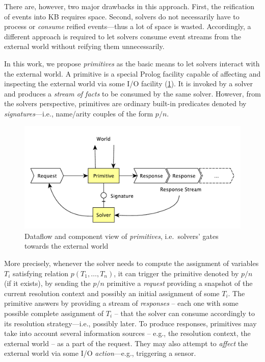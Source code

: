 \documentclass[12pt,a4paper,openright,twoside]{book}
\begin{document}
There are, however, two major drawbacks in this approach.
%
First, the reification of events into KB requires space.
%
Second, solvers do not necessarily have to process or \emph{consume} reified events---thus a lot of space is wasted.
%
Accordingly, a different approach is required to let solvers consume event streams from the external world without reifying them unnecessarily.

In this work, we propose \emph{primitives} as the basic means to let solvers interact with the external world.
%
A primitive is a special Prolog facility capable of affecting and inspecting the external world via some I/O facility (\cref{fig:primitives}).
%
It is invoked by a solver and produces a \emph{stream of facts} to be consumed by the same solver.
%
However, from the solvers perspective, primitives are ordinary built-in predicates denoted by \emph{signatures}---i.e., name/arity couples of the form $p/n$.

\begin{figure}\centering
    \includegraphics[width=\linewidth]{figures/primitive.pdf}
    \caption{Dataflow and component view of \emph{primitives}, i.e.\ solvers' gates towards the external world}
    \label{fig:primitives}
\end{figure}

More precisely, whenever the solver needs to compute the assignment of variables $T_i$ satisfying relation $p(T_1, \ldots, T_n)$, it can trigger the primitive denoted by $p/n$ (if it exists), by sending the $p/n$ primitive a \emph{request} providing a snapshot of the current resolution context and possibly an initial assignment of some $T_i$.
%
The primitive answers by providing a stream of \emph{responses} -- each one with some possible complete assignment of $T_i$ -- that the solver can consume accordingly to its resolution strategy---i.e., possibly later.
%
To produce responses, primitives may take into account several information sources -- e.g., the resolution context, the external world -- as a part of the request.
%
They may also attempt to \emph{affect} the external world via some I/O \emph{action}---e.g., triggering a sensor.
\end{document}

